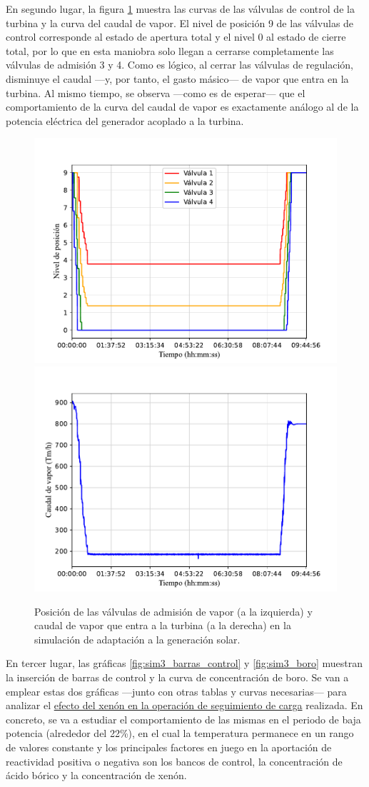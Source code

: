 En segundo lugar, la figura \ref{fig:sim3_valvulas_vapor} muestra las curvas de las válvulas de control de la turbina y la curva del caudal de vapor. El nivel de posición 9 de las válvulas de control corresponde al estado de apertura total y el nivel 0 al estado de cierre total, por lo que en esta maniobra solo llegan a cerrarse completamente las válvulas de admisión 3 y 4. Como es lógico, al cerrar las válvulas de regulación, disminuye el caudal ---y, por tanto, el gasto másico--- de vapor que entra en la turbina. Al mismo tiempo, se observa ---como es de esperar--- que el comportamiento de la curva del caudal de vapor es exactamente análogo al de la potencia eléctrica del generador acoplado a la turbina.

\begin{figure}[h]
  \includegraphics[width=0.5\linewidth]{content/figures/sim3_valvulas_control.pdf} 
  \includegraphics[width=0.5\linewidth]{content/figures/sim3_vapor.pdf}
  \caption{Posición de las válvulas de admisión de vapor (a la izquierda) y caudal de vapor que entra a la turbina (a la derecha) en la simulación de adaptación a la generación solar.}
  \label{fig:sim3_valvulas_vapor}
\end{figure}

En tercer lugar, las gráficas \ref{fig:sim3_barras_control} y \ref{fig:sim3_boro} muestran la inserción de barras de control y la curva de concentración de boro. Se van a emplear estas dos gráficas ---junto con otras tablas y curvas necesarias--- para analizar el \underline{efecto del xenón en la operación de seguimiento de carga} realizada. En concreto, se va a estudiar el comportamiento de las mismas en el periodo de baja potencia (alrededor del 22\%), en el cual la temperatura permanece en un rango de valores constante y los principales factores en juego en la aportación de reactividad positiva o negativa son los bancos de control, la concentración de ácido bórico y la concentración de xenón.

